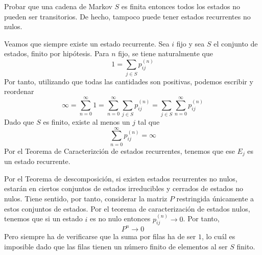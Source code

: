 \documentclass[twoside]{article}
\begin{document}
\begin{ejercicio}{9}
Probar que una cadena de Markov $S$ es finita entonces todos los estados no pueden ser transitorios. De hecho, tampoco puede tener estados recurrentes no nulos.
\end{ejercicio}
\begin{solucion}
Veamos que siempre existe un estado recurrente. Sea $i$ fijo y sea $S$ el conjunto de estados, finito por hipótesis. Para $n$ fijo, se tiene naturalmente que
$$
1 = \sum_{j \in S} p_{ij}^{(n)}
$$
Por tanto, utilizando que todas las cantidades son positivas, podemos escribir y reordenar
$$
\infty = \sum_{n =0}^{\infty} 1 = \sum_{n =0}^{\infty}\sum_{j \in S} p_{ij}^{(n)} = \sum_{j \in S} \sum_{n =0}^{\infty} p_{ij}^{(n)}	
$$
Dado que $S$ es finito, existe al menos un $j$ tal que
$$
 \sum_{n =0}^{\infty} p_{ij}^{(n)}	 = \infty
$$
Por el Teorema de Caracterizción de estados recurrentes, tenemos que ese $E_j$ es un estado recurrente.

Por el Teorema de descomposición, si existen estados recurrentes no nulos, estarán en ciertos conjuntos de estados irreducibles y cerrados de estados no nulos. Tiene sentido, por tanto, considerar la matriz $P$ restringida únicamente a estos conjuntos de estados. Por el teorema de caracterización de estados nulos, tenemos que si un estado $i$ es no nulo entonces $p_{ij}^{(n)}\to 0$. Por tanto,
$$
P^n \to 0
$$
Pero siempre ha de verificarse que la suma por filas ha de ser $1$, lo cuál es imposible dado que las filas tienen un número finito de elementos al ser $S$ finito.
\end{solucion}
\end{document}
